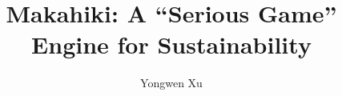 \documentclass[11pt,final,times,dissertation,proposal]{uhthesis2e}
\begin{document}
\title{Makahiki: A ``Serious Game'' Engine for Sustainability}
\author{Yongwen Xu}

\maketitle

\begin{frontmatter}

\signaturepage


%

%



\listoffixmes

\tableofcontents

\listoftables

\listoffigures


\end{frontmatter}
\end{document}
